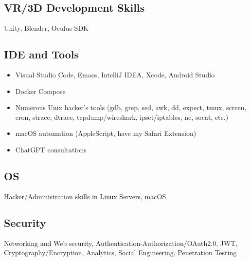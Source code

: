 \subsection*{VR/3D Development Skills}
Unity, Blender, Oculus SDK

\subsection*{IDE and Tools}
\begin{itemize}[noitemsep, nosep]
  \item Visual Studio Code, Emacs, IntelliJ IDEA, Xcode, Android Studio
  \item Docker Compose
  \item Numerous Unix hacker's tools (gdb, grep, sed, awk, dd, expect, tmux, screen, cron, strace, dtrace, tcpdump/wireshark, ipset/iptables, nc, socat, etc.)
  \item macOS automation (AppleScript, have my Safari Extension)
  \item ChatGPT consultations
\end{itemize}

\subsection*{OS}
Hacker/Administration skills in Linux Servers, macOS

\subsection*{Security}
Networking and Web security, Authentication-Authorization/OAuth2.0, JWT, Cryptography/Encryption, Analytics, Social Engineering, Penetration Testing

